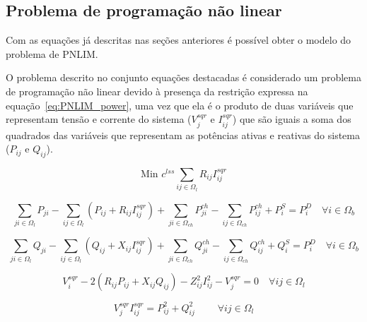 \subsection{Problema de programação não linear}

Com as equações já descritas nas seções anteriores é possível obter o modelo do problema de PNLIM.

O problema descrito no conjunto equações destacadas é considerado um problema de programação não linear devido à presença da restrição expressa na equação~\eqref{eq:PNLIM_power}, uma vez que ela é o produto de duas variáveis que representam tensão e corrente do sistema ($V_{j}^{sqr}$ e $I_{ij}^{sqr}$) que são iguais a soma dos quadrados das variáveis que representam as potências ativas e reativas do sistema ($P_{ij}$ e $Q_{ij}$).


\begin{tcolorbox}[breakable,pad at break*=1mm,colback=white!10,title =\textbf{Problema de PNLIM para RSD}]

\begin{equation}\label{eq:PNLIM_funcobj}
    \text{Min } c^{lss}\underset{ij\in\Omega_{l}}{\sum} R_{ij}I_{ij}^{sqr}
\end{equation}

\begin{equation}
    \sum_{ji\in\Omega_{l}}P_{ji} - \sum_{ij\in\Omega_{l}}(P_{ij} + R_{ij}I_{ij}^{sqr})+ \sum_{ji\in\Omega_{ch}}P_{ji}^{ch} -\sum_{ij\in\Omega_{ch}}P_{ij}^{ch} + P_{i}^{S} = P_{i}^{D}\quad\forall i \in\Omega_{b}\label{eq:PNLIM_fluxoP}  
\end{equation}
    
\begin{equation}
    \sum_{ji\in\Omega_{l}}Q_{ji} - \sum_{ij\in\Omega_{l}}(Q_{ij} + X_{ij}I_{ij}^{sqr})+ \sum_{ji\in\Omega_{ch}}Q_{ji}^{ch} -\sum_{ij\in\Omega_{ch}}Q_{ij}^{ch} + Q_{i}^{S} = P_{i}^{D}\quad\forall i \in\Omega_{b}
    \label{eq:PNLIM_fluxoQ}
\end{equation}

\begin{equation}\label{eq:PNLIM_voltage}
    V_{i}^{sqr} - 2(R_{ij}P_{ij} + X_{ij}Q_{ij}) - Z_{ij}^{2}I_{ij}^{2} - V_{j}^{sqr} = 0\quad\forall ij \in \Omega_{l}
\end{equation}

\begin{equation}\label{eq:PNLIM_power}
    V_{j}^{sqr}I_{ij}^{sqr} = P_{ij}^{2}+Q_{ij}^{2}\;\qquad\forall ij \in \Omega_{l}
\end{equation}


\end{tcolorbox}
